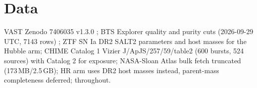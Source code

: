 \section{Data}
VAST Zenodo 7406035 v1.3.0 \citep{douglass23}; BTS Explorer quality and purity cuts (2026-09-29 UTC, 7143 rows) \citep{perley20,fremling19}; ZTF SN Ia DR2 SALT2 parameters and host masses \citep{rigault24} for the Hubble arm; CHIME Catalog 1 Vizier J/ApJS/257/59/table2 (600 bursts, 524 sources) \citep{chime21} with Catalog 2 \citep{chime26} for exposure; NASA-Sloan Atlas bulk fetch truncated (173\,MB/2.5\,GB); HR arm uses DR2 host masses instead, parent-mass completeness deferred; \citet{planck20} throughout.
